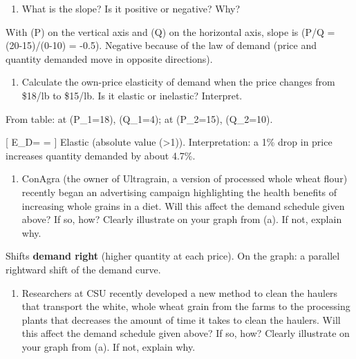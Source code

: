 \documentclass[
  letterpaper,
  DIV=11,
  numbers=noendperiod]{scrartcl}
\providecommand{\tightlist}{%
  \setlength{\itemsep}{0pt}\setlength{\parskip}{0pt}}
\begin{document}
\begin{enumerate}
\def\labelenumi{\alph{enumi}.}
\setcounter{enumi}{1}
\tightlist
\item
  What is the slope? Is it positive or negative? Why?
\end{enumerate}

With (P) on the vertical axis and (Q) on the horizontal axis, slope is
(\Delta P/\Delta Q = (20-15)/(0-10) = -0.5). Negative because of the law
of demand (price and quantity demanded move in opposite directions).

\begin{enumerate}
\def\labelenumi{\alph{enumi}.}
\setcounter{enumi}{2}
\tightlist
\item
  Calculate the own-price elasticity of demand when the price changes
  from \$18/lb to \$15/lb. Is it elastic or inelastic? Interpret.
\end{enumerate}

From table: at (P\_1=18), (Q\_1=4); at (P\_2=15), (Q\_2=10).

{[} E\_D=
=\approx {}
{]} Elastic (absolute value (\textgreater1)). Interpretation: a 1\% drop
in price increases quantity demanded by about 4.7\%.

\begin{enumerate}
\def\labelenumi{\alph{enumi}.}
\setcounter{enumi}{3}
\tightlist
\item
  ConAgra (the owner of Ultragrain, a version of processed whole wheat
  flour) recently began an advertising campaign highlighting the health
  benefits of increasing whole grains in a diet. Will this affect the
  demand schedule given above? If so, how? Clearly illustrate on your
  graph from (a). If not, explain why.
\end{enumerate}

Shifts \textbf{demand right} (higher quantity at each price). On the
graph: a parallel rightward shift of the demand curve.

\begin{enumerate}
\def\labelenumi{\alph{enumi}.}
\setcounter{enumi}{4}
\tightlist
\item
  Researchers at CSU recently developed a new method to clean the
  haulers that transport the white, whole wheat grain from the farms to
  the processing plants that decreases the amount of time it takes to
  clean the haulers. Will this affect the demand schedule given above?
  If so, how? Clearly illustrate on your graph from (a). If not, explain
  why.
\end{enumerate}
\end{document}
